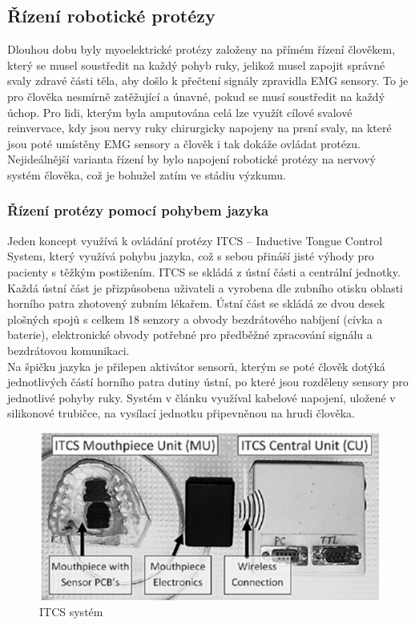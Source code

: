 \documentclass[a4paper,12pt]{article}
\begin{document}
\subsection{Řízení robotické protézy}
Dlouhou dobu byly myoelektrické protézy založeny na přímém řízení člověkem, který se musel soustředit na každý pohyb ruky, jelikož musel zapojit správné svaly zdravé části těla, aby došlo k přečtení signály zpravidla EMG sensory. To je pro člověka nesmírně zatěžující a únavné, pokud se musí soustředit na každý úchop. Pro lidi, kterým byla amputována celá lze využít cílové svalové reinvervace, kdy jsou nervy ruky chirurgicky napojeny na prsní svaly, na které jsou poté umístěny EMG sensory a člověk i tak dokáže ovládat protézu.
Nejideálnější varianta řízení by bylo napojení robotické protézy na nervový systém člověka, což je bohužel zatím ve stádiu výzkumu.\cite{Chappell}\cite{Tongue}

\subsubsection{Řízení protézy pomocí pohybem jazyka}
Jeden koncept využívá k ovládání protézy ITCS – Inductive Tongue Control System, který využívá pohybu jazyka, což s sebou přináší jisté výhody pro pacienty s těžkým postižením. ITCS se skládá z ústní části a centrální jednotky. Každá ústní část je přizpůsobena uživateli a vyrobena dle zubního otisku oblasti horního patra zhotovený zubním lékařem. Ústní část se skládá ze dvou desek plošných spojů s celkem 18 senzory a obvody bezdrátového nabíjení (cívka a baterie), elektronické obvody potřebné pro předběžné zpracování signálu a bezdrátovou komunikaci.\cite{Tongue}
\\
Na špičku jazyka je přilepen aktivátor sensorů, kterým se poté člověk dotýká jednotlivých částí horního patra dutiny ústní, po které jsou rozděleny sensory pro jednotlivé pohyby ruky. Systém v článku využíval kabelové napojení, uložené v silikonové trubičce, na vysílací jednotku připevněnou na hrudi člověka.\cite{Tongue}

\begin{figure}[hbtp]
\centering
\includegraphics[scale=1]{figures/ITCS_control.PNG}
\caption{ITCS systém \cite{Tongue}}
\end{figure}\break
\end{document}
